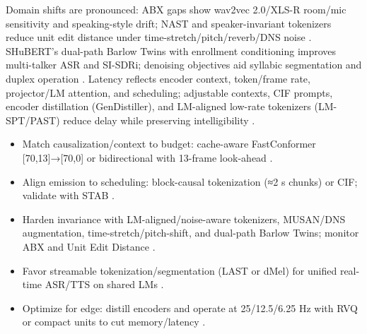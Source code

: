 \documentclass{article}
\begin{document}
Domain shifts are pronounced: ABX gaps show wav2vec 2.0/XLS-R room/mic sensitivity and speaking-style drift; NAST and speaker-invariant tokenizers reduce unit edit distance under time-stretch/pitch/reverb/DNS noise \cite{fily2024establishingdegreesclosenessbetweenaudio,messica2024nastnoiseawarespeechtokenizationlanguage,chang2024dcspinspeakerinvariantspeechtokenizerspo}. SHuBERT’s dual-path Barlow Twins with enrollment conditioning improves multi-talker ASR and SI-SDRi; denoising objectives aid syllabic segmentation and duplex operation \cite{entry2025selectivehubertselfsupervisedpretraining,cho2025sylbersyllabicembeddingrepresentationspe,ma2024languagemodelcanlistenwhilespeaking}. Latency reflects encoder context, token/frame rate, projector/LM attention, and scheduling; adjustable contexts, CIF prompts, encoder distillation (GenDistiller), and LM-aligned low-rate tokenizers (LM-SPT/PAST) reduce delay while preserving intelligibility \cite{chen2024bestowefficientstreamablespeechlanguagem,deng2025simuls2sllmunlockingsimultaneousinferenc,gao2024gendistillerdistillingpretrainedlanguage,jo2025lmsptalignedsemanticdistillationspeechto,har-tuv2025pastphoneticacousticspeechtokenizer}.

\begin{itemize}
  \item Match causalization/context to budget: cache-aware FastConformer [70,13]→[70,0] or bidirectional with 13-frame look-ahead \cite{chen2024bestowefficientstreamablespeechlanguagem}.
  \item Align emission to scheduling: block-causal tokenization (≈2 s chunks) or CIF; validate with STAB \cite{vashishth2024stabspeechtokenizerassessmentbenchmark,deng2025simuls2sllmunlockingsimultaneousinferenc}.
  \item Harden invariance with LM-aligned/noise-aware tokenizers, MUSAN/DNS augmentation, time-stretch/pitch-shift, and dual-path Barlow Twins; monitor ABX and Unit Edit Distance \cite{turetzky2024lastlanguagemodelawarespeechtokenization,messica2024nastnoiseawarespeechtokenizationlanguage,poli2025fastabxlibraryefficientcomputationabxdis}.
  \item Favor streamable tokenization/segmentation (LAST or dMel) for unified real-time ASR/TTS on shared LMs \cite{turetzky2024lastlanguagemodelawarespeechtokenization,bai2025dmelspeechtokenizationmadesimple}.
  \item Optimize for edge: distill encoders and operate at 25/12.5/6.25 Hz with RVQ or compact units to cut memory/latency \cite{ahasan2025dmcodecdistillingmultimodalrepresentatio,jo2025lmsptalignedsemanticdistillationspeechto}.
\end{itemize}
\end{document}

